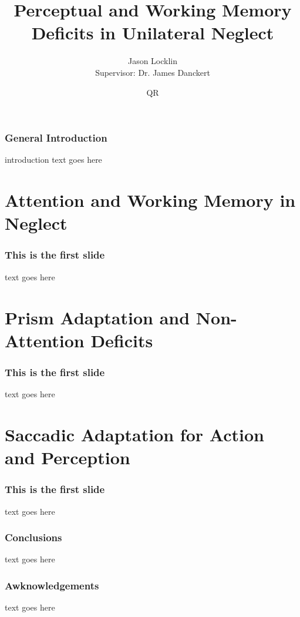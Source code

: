 \documentclass{beamer}
\title[Perception and Working Memory in Neglect]{Perceptual and Working Memory Deficits in Unilateral Neglect}
\subtitle{}
\author{Jason Locklin\inst{} \\
Supervisor: Dr. James Danckert}
\institute[University of Waterloo] 
{
  \inst{}%
  Department of Psychology\\
  University of Waterloo 
}
\date[August 6, 2015] 
{QR}
\begin{document}

\frame{\titlepage}

\begin{frame}
 \frametitle{General Introduction}
 introduction text goes here
\end{frame}




\section[Attention and WM]{Attention and Working Memory in Neglect} 

 \begin{frame}
  \frametitle{This is the first slide}
  text goes here
 \end{frame}

 \section[Prisms]{Prism Adaptation and Non-Attention Deficits} 

 \begin{frame}
  \frametitle{This is the first slide}
  text goes here
 \end{frame}

\section[Saccadic Adaptation]{Saccadic Adaptation for Action and Perception} 

 \begin{frame}
  \frametitle{This is the first slide}
  text goes here
 \end{frame}

 \begin{frame}
  \frametitle{Conclusions}
  text goes here
 \end{frame}

 \begin{frame}
  \frametitle{Awknowledgements}
  text goes here
 \end{frame}



 
 
\end{document}
